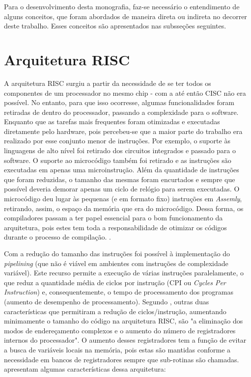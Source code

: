 Para o desenvolvimento desta monografia, faz-se necessário o entendimento de alguns conceitos, que foram abordados de maneira direta ou indireta no decorrer deste trabalho. Esses conceitos são apresentados nas subsseções seguintes.

\section{Arquitetura RISC}
\label{secao:arquiterura_risc}

A arquitetura RISC surgiu a partir da necessidade de se ter todos os componentes de um processador no mesmo chip - com a até então CISC não era possível. No entanto, para que isso ocorresse, algumas funcionalidades foram retiradas de dentro do processador, passando a complexidade para o software. Enquanto que as tarefas mais frequentes foram otimizadas e executadas diretamente pelo hardware, pois percebeu-se que a maior parte do trabalho era realizado por esse conjunto menor de instruções. Por exemplo, o suporte às linguagens de alto nível foi retirado dos circuitos integrados e passado para o software. O suporte ao microcódigo também foi retirado e as instruções são executadas em apenas uma microinstrução. Além da quantidade de instruções que foram reduzidas, o tamanho das mesmas foram encurtados e sempre que possível deveria demorar apenas um ciclo de relógio para serem executadas. O microcódigo deu lugar às pequenas (e em formato fixo) instruções em \textit{Assemly}, retirando, assim, o espaço da memória que era do microcódigo. Dessa forma, os compiladores passam a ter papel essencial para o bom funcionamento da arquitetura, pois estes tem toda a responsabilidade de otimizar os códigos durante o processo de compilação. \cite{silva:2008:comparacao}.

Com a redução do tamanho das instruções foi possível à implementação do \textit{pipelining} (que não é viável em ambientes com instruções de complexidade variável). Este recurso permite a execução de várias instruções paralelamente, o que reduz a quantidade média de ciclos por instrução (CPI ou \textit{Cycles Per Instruction}) e, consequentemente, o tempo de processamento dos programas (aumento de desempenho de processamento). Segundo \citet{silva:2008:comparacao}, outras duas características que permitiram a redução de ciclos/instrução, aumentando minimamente o tamanho do código na arquitetura RISC, são "a eliminação dos modos de endereçamento complexos e o aumento do número de registradores internos do processador". O aumento desses registradores tem a função de evitar a busca de variáveis locais na memória, pois estas são mantidas conforme a necessidade em bancos de registradores sempre que sub-rotinas são chamadas. \citet{azevedo:2014:comparacao} apresentam algumas características dessa arquitetura:

